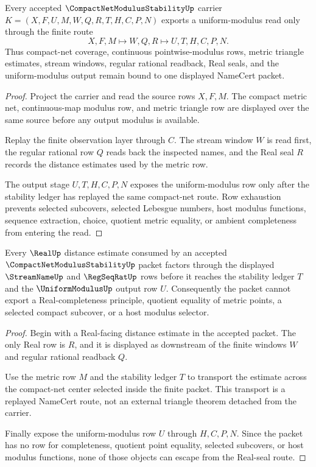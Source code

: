 \begin{theorem}
\label{thm:compact-net-modulus-stability-finite-route}
Every accepted $\CompactNetModulusStabilityUp$ carrier $K=(X,F,U,M,W,Q,R,T,H,C,P,N)$ exports a uniform-modulus read only through the finite route
$$
X,F,M \longmapsto W,Q,R \longmapsto U,T,H,C,P,N .
$$
Thus compact-net coverage, continuous pointwise-modulus rows, metric triangle estimates, stream windows, regular rational readback, Real seals, and the uniform-modulus output remain bound to one displayed NameCert packet.
\end{theorem}
\begin{proof}
Project the carrier and read the source rows $X,F,M$. The compact metric net, continuous-map modulus row, and metric triangle row are displayed over the same source before any output modulus is available.

Replay the finite observation layer through $C$. The stream window $W$ is read first, the regular rational row $Q$ reads back the inspected names, and the Real seal $R$ records the distance estimates used by the metric row.

The output stage $U,T,H,C,P,N$ exposes the uniform-modulus row only after the stability ledger has replayed the same compact-net route. Row exhaustion prevents selected subcovers, selected Lebesgue numbers, host modulus functions, sequence extraction, choice, quotient metric equality, or ambient completeness from entering the read.
\end{proof}

\begin{theorem}
\label{thm:compact-net-modulus-stability-real-seal-nonescape}
Every $\RealUp$ distance estimate consumed by an accepted $\CompactNetModulusStabilityUp$ packet factors through the displayed $\StreamNameUp$ and $\RegSeqRatUp$ rows before it reaches the stability ledger $T$ and the $\UniformModulusUp$ output row $U$. Consequently the packet cannot export a Real-completeness principle, quotient equality of metric points, a selected compact subcover, or a host modulus selector.
\end{theorem}
\begin{proof}
Begin with a Real-facing distance estimate in the accepted packet. The only Real row is $R$, and it is displayed as downstream of the finite windows $W$ and regular rational readback $Q$.

Use the metric row $M$ and the stability ledger $T$ to transport the estimate across the compact-net center selected inside the finite packet. This transport is a replayed NameCert route, not an external triangle theorem detached from the carrier.

Finally expose the uniform-modulus row $U$ through $H,C,P,N$. Since the packet has no row for completeness, quotient point equality, selected subcovers, or host modulus functions, none of those objects can escape from the Real-seal route.
\end{proof}

